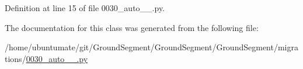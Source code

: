Definition at line 15 of file 0030\+\_\+auto\+\_\+\_.\+py.



The documentation for this class was generated from the following file\+:\begin{DoxyCompactItemize}
\item 
/home/ubuntumate/git/\+Ground\+Segment/\+Ground\+Segment/\+Ground\+Segment/migrations/\hyperlink{0030__auto__20170125__1955_8py}{0030\+\_\+auto\+\_\+\_.\+py}\end{DoxyCompactItemize}
